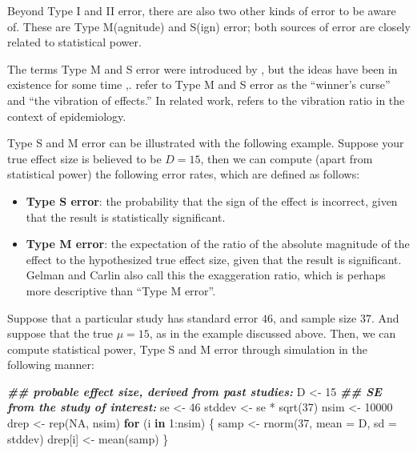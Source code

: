 \documentclass[
  12pt,
]{krantz}
\newenvironment{Shaded}{\begin{snugshade}}{\end{snugshade}}
\newcommand{\AttributeTok}[1]{\textcolor[rgb]{0.77,0.63,0.00}{#1}}
\newcommand{\ConstantTok}[1]{\textcolor[rgb]{0.00,0.00,0.00}{#1}}
\newcommand{\ControlFlowTok}[1]{\textcolor[rgb]{0.13,0.29,0.53}{\textbf{#1}}}
\newcommand{\DecValTok}[1]{\textcolor[rgb]{0.00,0.00,0.81}{#1}}
\newcommand{\DocumentationTok}[1]{\textcolor[rgb]{0.56,0.35,0.01}{\textbf{\textit{#1}}}}
\newcommand{\FunctionTok}[1]{\textcolor[rgb]{0.00,0.00,0.00}{#1}}
\newcommand{\NormalTok}[1]{#1}
\newcommand{\OtherTok}[1]{\textcolor[rgb]{0.56,0.35,0.01}{#1}}
\newcommand{\SpecialCharTok}[1]{\textcolor[rgb]{0.00,0.00,0.00}{#1}}
\providecommand{\tightlist}{%
  \setlength{\itemsep}{0pt}\setlength{\parskip}{0pt}}
\theoremstyle{definition}
\theoremstyle{definition}
\theoremstyle{definition}
\theoremstyle{definition}
\theoremstyle{remark}
\begin{document}
Beyond Type I and II error, there are also two other kinds of error to be aware of. These are Type M(agnitude) and S(ign) error; both sources of error are closely related to statistical power.

The terms Type M and S error were introduced by \citet{Gelman14}, but the ideas have been in existence for some time \citep{hedges1984estimation},\citep{lane1978estimating}. \citet{powerfailure} refer to Type M and S error as the ``winner's curse'' and ``the vibration of effects.'' In related work, \citet{ioannidis2008most} refers to the vibration ratio in the context of epidemiology.

Type S and M error can be illustrated with the following example.
Suppose your true effect size is believed to be \(D=15\),
then we can compute (apart from statistical power) the following error rates, which are defined as follows:

\begin{itemize}
\tightlist
\item
  \textbf{Type S error}: the probability that the sign of the effect is incorrect, given that the result is statistically significant.
\item
  \textbf{Type M error}: the expectation of the ratio of the absolute magnitude of the effect to the hypothesized true effect size, given that the result is significant.
  Gelman and Carlin also call this the exaggeration ratio, which is perhaps more descriptive than ``Type M error''.
\end{itemize}

Suppose that a particular study has standard error \(46\), and sample size \(37\). And suppose that the true \(\mu=15\), as in the example discussed above. Then, we can compute statistical power, Type S and M error through simulation in the following manner:

\begin{Shaded}
\begin{Highlighting}[]
\DocumentationTok{\#\# probable effect size, derived from past studies:}
\NormalTok{D }\OtherTok{\textless{}{-}} \DecValTok{15}
\DocumentationTok{\#\# SE from the study of interest:}
\NormalTok{se }\OtherTok{\textless{}{-}} \DecValTok{46}
\NormalTok{stddev }\OtherTok{\textless{}{-}}\NormalTok{ se }\SpecialCharTok{*} \FunctionTok{sqrt}\NormalTok{(}\DecValTok{37}\NormalTok{)}
\NormalTok{nsim }\OtherTok{\textless{}{-}} \DecValTok{10000}
\NormalTok{drep }\OtherTok{\textless{}{-}} \FunctionTok{rep}\NormalTok{(}\ConstantTok{NA}\NormalTok{, nsim)}
\ControlFlowTok{for}\NormalTok{ (i }\ControlFlowTok{in} \DecValTok{1}\SpecialCharTok{:}\NormalTok{nsim) \{}
\NormalTok{  samp }\OtherTok{\textless{}{-}} \FunctionTok{rnorm}\NormalTok{(}\DecValTok{37}\NormalTok{, }\AttributeTok{mean =}\NormalTok{ D, }\AttributeTok{sd =}\NormalTok{ stddev)}
\NormalTok{  drep[i] }\OtherTok{\textless{}{-}} \FunctionTok{mean}\NormalTok{(samp)}
\NormalTok{\}}
\end{Highlighting}
\end{Shaded}
\end{document}
